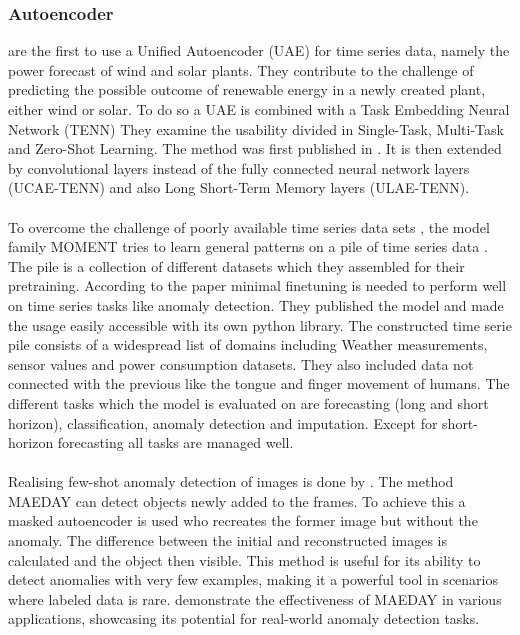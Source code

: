 \subsubsection{Autoencoder}
 are the first to use a Unified Autoencoder (UAE) for time series data, namely the power forecast of wind and solar plants. They contribute to the challenge of predicting the possible outcome of renewable energy in a newly created plant, either wind or solar. To do so a UAE is combined with a Task Embedding Neural Network (TENN) They examine the usability divided in Single-Task, Multi-Task and Zero-Shot Learning. The method was first published in . It is then extended by convolutional layers instead of the fully connected neural network layers (UCAE-TENN)
and also Long Short-Term Memory layers (ULAE-TENN).\\\\
To overcome the challenge of poorly available time series data sets \cite{ma_survey_2023}, the model family MOMENT tries to learn general patterns on a pile of time series data \cite{goswami_moment_2024}. The pile is a collection of different datasets which they assembled for their pretraining. According to the paper minimal finetuning is needed to perform well on time series tasks like anomaly detection. They published the model and made the usage easily accessible with its own python library. The constructed time serie pile consists of a widespread list of domains including Weather measurements, sensor values and power consumption datasets. They also included data not connected with the previous like the tongue and finger movement of humans. The different tasks which the model is evaluated on are forecasting (long and short horizon), classification, anomaly detection and imputation. Except for short-horizon forecasting all tasks are managed well. \\\\
Realising few-shot anomaly detection of images is done by . The method MAEDAY can detect objects newly added to the frames. To achieve this a masked autoencoder is used who recreates the former image but without the anomaly. The difference between the initial and reconstructed images is calculated and the object then visible.
This method is useful for its ability to detect anomalies with very few examples, making it a powerful tool in scenarios where labeled data is rare.  demonstrate the effectiveness of MAEDAY in various applications, showcasing its potential for real-world anomaly detection tasks.\\\\
